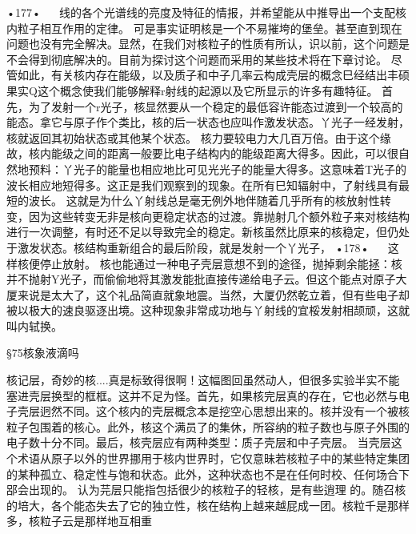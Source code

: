 •177•
  
线的各个光谱线的亮度及特征的情报，并希望能从中推导出一个支配核内粒子相互作用的定律。
可是事实证明核是一个不易摧垮的堡垒。甚至直到现在问题也没有完全解决。显然，在我们对核粒子的性质有所认，识以前，这个问题是不会得到彻底解决的。目前为探讨这个问题而采用的某些技术将在下章讨论。
尽管如此，有关核内存在能级，以及质子和中子几率云构成壳层的概念巳经结出丰硕果实Q这个概念使我们能够解释r射线的起源以及它所显示的许多有趣特征。
首先，为了发射一个r光子，核显然要从一个稳定的最低容许能态过渡到一个较高的能态。拿它与原子作个类比，核的后一状态也应叫作激发状态。丫光子一经发射，核就返回其初始状态或其他某个状态。
核力要较电力大几百万倍。由于这个缘故，核内能级之间的距离一般要比电子结构内的能级距离大得多。因此，可以很自然地预料：丫光子的能量也相应地比可见光光子的能量大得多。这意味着T光子的波长相应地短得多。这正是我们观察到的现象。在所有巳知辐射中，了射线具有最短的波长。
这就是为什么丫射线总是毫无例外地伴随着几乎所有的核放射性转变，因为这些转变无非是核向更稳定状态的过渡。靠抛射几个额外粒子来对核结构进行一次调整，有时还不足以导致完全的稳定。新核虽然比原来的核稳定，但仍处于激发状态。核结构重新组合的最后阶段，就是发射一个丫光子，
•178•
  
这样核便停止放射。
核也能通过一种电子壳层意想不到的途径，抛掉剩余能拯：核并不抛射Y光子，而偷偷地将其激发能批直接传递给电子云。但这个能点对原子大厦来说是太大了，这个礼品简直就象地震。当然，大厦仍然乾立着，但有些电子却被以极大的速良驱逐出境。这种现象非常成功地与丫射线的宜桵发射相颉顽，这就叫内轼换。

§75核象液滴吗

核记层，奇妙的核....真是标致得很啊！这幅图回虽然动人，但很多实验半实不能塞进壳层换型的框框。这并不足为怪。首先，如果核完层真的存在，它也必然与电子壳层迥然不同。这个核内的壳层概念本是挖空心思想出来的。核并没有一个被核粒子包围着的核心。此外，核这个满员了的集休，所容纳的粒子数也与原子外围的电子数十分不同。最后，核壳层应有两种类型：质子壳层和中子壳层。
当壳层这个术语从原子以外的世界挪用于核内世界时，它仅意昧若核粒子中的某些特定集团的某种孤立、稳定性与饱和状态。此外，这种状态也不是在任何时校、任何场合下郘会出现的。
认为芫层只能指包括很少的核粒子的轻核，是有些逍理
的。随召核的培大，各个能态失去了它的独立性，核在结构上越来越屁成一团。核粒千是那样多，核粒子云是那样地互相重

